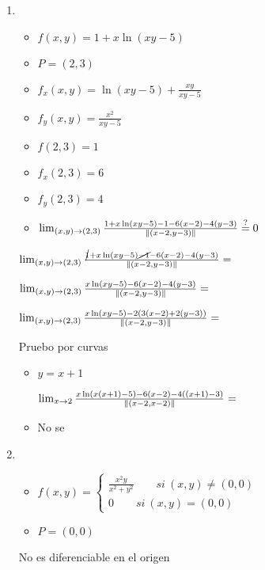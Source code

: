 \documentclass[../practica_04.tex]{subfiles}
\begin{document}
    \begin{enumerate}
        \item 
            \begin{itemize}
                \item $f(x,y) = 1 + x\ln(xy - 5)$
                \item $P = (2,3)$
                \item $f_x(x,y) = \ln(xy-5) + \frac{xy}{xy-5}$
                \item $f_y(x,y) = \frac{x^2}{xy-5}$
                \item $f(2,3) = 1$
                \item $f_x(2,3) = 6$
                \item $f_y(2,3) = 4$
                \item $\lim_{(x,y)\to(2,3)} \frac{1 + x\ln(xy - 5) - 1 - 6(x-2) - 4(y-3)}{\norm*{(x-2,y-3)}} \stackrel{?}{=} 0$
            \end{itemize}

            $\lim_{(x,y)\to(2,3)} \frac{\cancel{1} + x\ln(xy - 5) \cancel{- 1} - 6(x-2) - 4(y-3)}{\norm*{(x-2,y-3)}} =$
            
            $\lim_{(x,y)\to(2,3)} \frac{x\ln(xy - 5) - 6(x-2) - 4(y-3)}{\norm*{(x-2,y-3)}} =$

            $\lim_{(x,y)\to(2,3)} \frac{x\ln(xy - 5) - 2(3(x-2) + 2(y-3))}{\norm*{(x-2,y-3)}} =$

            Pruebo por curvas

            \begin{itemize}
                \item $ y = x + 1$

                    $\lim_{x\to2} \frac{x\ln(x(x+1) - 5) - 6(x-2) - 4((x+1)-3)}{\norm*{(x-2,x-2)}} =$
                \item  No se
            \end{itemize}

        \item 
            \begin{itemize}
                \item $f(x,y) = 
                    \left\{
                        \begin{array}{ll}
                            \frac{x^2y}{x^2+y^2} \qquad si\ (x,y) \neq (0,0)\\
                            0 \qquad si\ (x,y) = (0,0)
                        \end{array}
                    \right.$
                \item $P=(0,0)$
            \end{itemize}

                No es diferenciable en el origen
    \end{enumerate}
\end{document}
